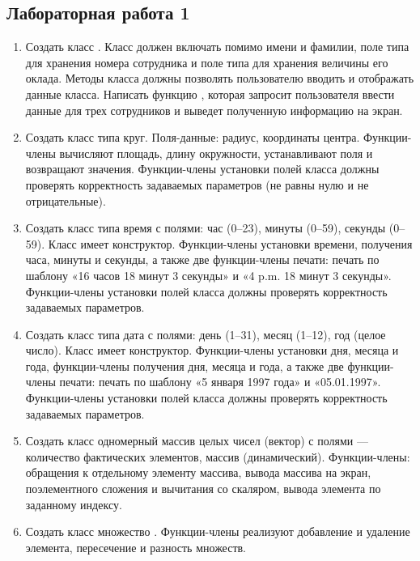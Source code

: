 \subsection{Лабораторная работа 1}
\begin{enumerate}[leftmargin=*]
    \item Создать класс . Класс должен включать помимо имени и фамилии, поле типа  для хранения номера сотрудника и поле типа  для хранения величины его оклада. Методы класса должны позволять пользователю вводить и отображать данные класса. Написать функцию , которая запросит пользователя ввести данные для трех сотрудников и выведет полученную информацию на экран.
    \item Создать класс типа круг. Поля-данные: радиус, координаты центра. Функции-члены вычисляют площадь, длину окружности, устанавливают поля и возвращают значения. Функции-члены установки полей класса должны проверять корректность задаваемых параметров (не равны нулю и не отрицательные).
    \item Создать класс типа время с полями: час (0–23), минуты (0–59), секунды (0–59). Класс имеет конструктор. Функции-члены установки времени, получения часа, минуты и секунды, а также две функции-члены печати: печать по шаблону «16 часов 18 минут 3 секунды» и «4 p.m. 18 минут 3 секунды». Функции-члены установки полей класса должны проверять корректность задаваемых параметров.
    \item Создать класс типа дата с полями: день (1–31), месяц (1–12), год (целое число). Класс имеет конструктор. Функции-члены установки дня, месяца и года, функции-члены получения дня, месяца и года, а также две функции-члены печати: печать по шаблону «5 января 1997 года» и «05.01.1997». Функции-члены установки полей класса должны проверять корректность задаваемых параметров.
    \item Создать класс одномерный массив целых чисел (вектор) с полями --- количество фактических элементов, массив (динамический). Функции-члены: обращения к отдельному элементу массива, вывода массива на экран, поэлементного сложения и вычитания со скаляром, вывода элемента по заданному индексу.
    \item Создать класс множество . Функции-члены реализуют добавление и удаление элемента, пересечение и разность множеств.
\end{enumerate}

